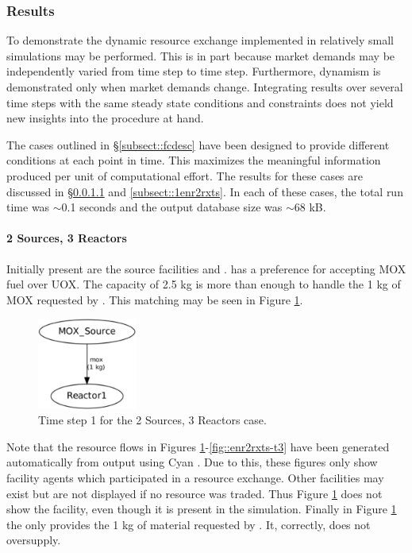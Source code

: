\subsubsection{Results}

To demonstrate the dynamic resource exchange implemented in \Cyclus{} relatively
small simulations may be performed. This is in part because market demands may
be independently varied from time step to time step.  Furthermore, dynamism is
demonstrated only when market demands change. Integrating results over several
time steps with the same steady state conditions and constraints does not yield
new insights into the procedure at hand.

The cases outlined in \S \ref{subsect::fcdesc} have been designed to 
provide different conditions at each point in time. This maximizes the
meaningful information produced per unit of computational effort.
The results for these cases are discussed in \S \ref{subsect::2srcs3rxts} and 
\ref{subsect::1enr2rxts}.  In each of these cases, the total \Cyclus{} run time
was $\sim$0.1 seconds and the output database size was $\sim$68 kB.

\paragraph{2 Sources, 3 Reactors}
\label{subsect::2srcs3rxts}
Initially present are the source facilities and .   has 
a preference for accepting MOX fuel over UOX.  The \MOXSource{} capacity of 2.5 kg 
is more than 
enough to handle the 1 kg of MOX requested by .  This matching may be seen
in Figure \ref{fig::2srcs3rxts-t1}.

\begin{figure}
  \begin{center}
    \includegraphics[height=3cm]{./figs/2_Sources_3_Reactors-t1.pdf}
    \caption[]{\label{fig::2srcs3rxts-t1}Time step 1 for the 2 Sources, 3 Reactors 
        case.}
  \end{center}
\end{figure}

Note that the resource flows in Figures 
\ref{fig::2srcs3rxts-t1}-\ref{fig::enr2rxts-t3}
have been generated automatically from \Cyclus{} output using
Cyan \cite{Carlsen2014}.  Due to this, these figures only show facility agents
which participated in a resource exchange. Other facilities may exist but are
not displayed if no resource was traded.  Thus Figure \ref{fig::2srcs3rxts-t1}
does not show the \UOXSource{} facility, even though it is present in the
simulation.  Finally in Figure \ref{fig::2srcs3rxts-t1} the \MOXSource{} only
provides the 1 kg of material requested by .  It, correctly, does not
oversupply.


